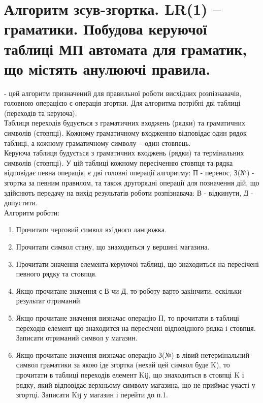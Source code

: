 \section{Алгоритм зсув-згортка. LR(1) – граматики. Побудова  керуючої таблиці МП автомата для граматик, що містять анулюючі правила. }

 - цей алгоритм призначений для правильної роботи висхідних розпізнавачів, головною операцією є операція згортки. Для алгоритма потрібні дві таблиці (переходів та керуюча). \\

Таблиця переходів будується з граматичних входжень (рядки) та граматичних символів (стовпці). Кожному граматичному входженню відповідає один рядок таблиці, а кожному граматичному символу – один
стовпець.\\

Керуюча таблиця будується з граматичних входжень (рядки) та термінальних символів  (стовпці). У цій таблиці кожному пересіченню стовпця та рядка відповідає певна операція, є дві головні операції алгоритму: П - перенос, З(№) - згортка за певним правилом, та також другорядні операції для позначення дій, що здійснють передачу на вихід результатів роботи розпізнавача: В - відкинути, Д - допустити.\\

Алгоритм роботи:

\begin{enumerate}
  \item Прочитати черговий символ вхідного ланцюжка.
  \item Прочитати символ стану, що знаходиться у вершині магазина.
  \item Прочитати значення елемента керуючої таблиці, що знаходиться на пересічені певного рядку та стовпця.
  \item Якщо прочитане значення є В чи Д, то роботу варто закінчити, оскільки результат отриманий.
  \item Якщо прочитане значення визначає операцію П, то прочитати в таблиці переходів елемент що знаходится на пересічені відповідного рядка і стовпця. Записати отриманий символ у магазин.
  \item Якщо прочитане значення визначає операцію З(№) в лівий нетермінальний символ граматики за якою іде згортка (нехай цей символ буде K), то прочитати в таблиці переходів елемент Kij, що
  знаходиться в стовпці K і рядку, який відповідає верхньому символу магазина, що не приймає участі у згортці. Записати Kij у магазин і перейти до п.1.​
\end{enumerate}

